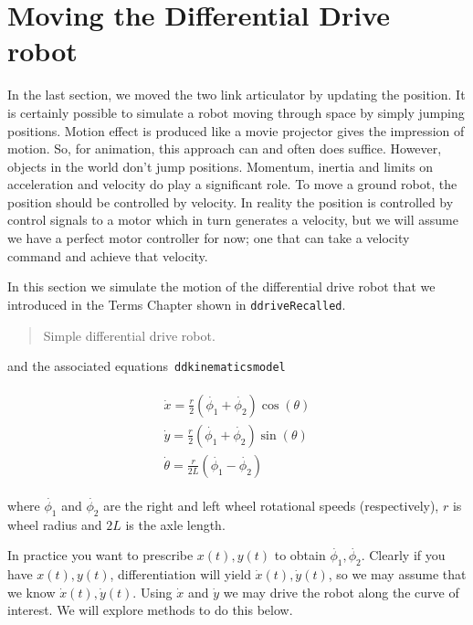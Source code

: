 \hypertarget{moving-the-differential-drive-robot}{%
\section{Moving the Differential Drive
robot}\label{moving-the-differential-drive-robot}}

In the last section, we moved the two link articulator by updating the
position. It is certainly possible to simulate a robot moving through
space by simply jumping positions. Motion effect is produced like a
movie projector gives the impression of motion. So, for animation, this
approach can and often does suffice. However, objects in the world don't
jump positions. Momentum, inertia and limits on acceleration and
velocity do play a significant role. To move a ground robot, the
position should be controlled by velocity. In reality the position is
controlled by control signals to a motor which in turn generates a
velocity, but we will assume we have a perfect motor controller for now;
one that can take a velocity command and achieve that velocity.

In this section we simulate the motion of the differential drive robot
that we introduced in the Terms Chapter shown in
\texttt{ddriveRecalled}.

\begin{quote}
Simple differential drive robot.
\end{quote}

and the associated equations~\texttt{ddkinematicsmodel}

\[\begin{aligned}
\boxed{
\begin{array}{l}
 \dot{x} = \frac{r}{2} (\dot{\phi_1}+\dot{\phi_2})\cos(\theta) \\[5mm]
\dot{y} = \frac{r}{2} (\dot{\phi_1}+\dot{\phi_2})\sin(\theta) \\[5mm]
\dot{\theta} = \frac{r}{2L} (\dot{\phi_1}-\dot{\phi_2})
\end{array}}
\end{aligned}\]

where \(\dot{\phi_1}\) and \(\dot{\phi_2}\) are the right and left wheel
rotational speeds (respectively), \(r\) is wheel radius and \(2L\) is
the axle length.

In practice you want to prescribe \(x(t), y(t)\) to obtain
\(\dot{\phi_1},\dot{\phi_2}\). Clearly if you have \(x(t), y(t)\),
differentiation will yield \(\dot{x}(t), \dot{y}(t)\), so we may assume
that we know \(\dot{x}(t), \dot{y}(t)\). Using \(\dot{x}\) and
\(\dot{y}\) we may drive the robot along the curve of interest. We will
explore methods to do this below.

